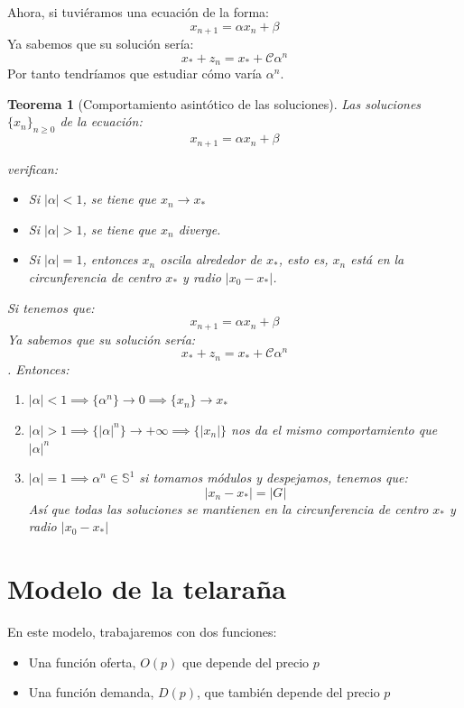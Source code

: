 \documentclass[11pt, a4paper, titlepage]{article}
\makeatletter
\renewenvironment{proof}[1][\proofname] {\vspace{-15pt}\par\pushQED{\qed}\normalfont\topsep6\p@\@plus6\p@\relax\trivlist\item[\hskip\labelsep\it#1\@addpunct{.}]\ignorespaces}{\popQED\endtrivlist\@endpefalse}
\theoremstyle{theorem-style}
\newtheorem*{nth}{Teorema}
\theoremstyle{definition-style}
\theoremstyle{remark-style}
\theoremstyle{example-style}
\newenvironment{nlist}
{\begin{enumerate}
\renewcommand\labelenumi{(\emph{\roman{enumi})}}}
{\end{enumerate}}
\makeatother
\begin{document}
Ahora, si tuviéramos una ecuación de la forma:
\[
x_{n+1}= \alpha x_n + \beta
\]
Ya sabemos que su solución sería:
\[
x_* +z_n = x_* + \mathcal{C}\alpha^n
\]
Por tanto tendríamos que estudiar cómo varía $\alpha^n$.


\begin{nth}[Comportamiento asintótico de las soluciones]
	Las soluciones $\{x_n\}_{n\geq0}$ de la ecuación:
\[
x_{n+1} = \alpha x_n + \beta
\]

verifican:

\begin{itemize}
\item Si $|\alpha| < 1$, se tiene que ${x_n} \to x_*$
\item Si $|\alpha| > 1$, se tiene que ${x_n}$ diverge.
\item Si $|\alpha| = 1$, entonces ${x_n}$ oscila alrededor de $x_*$, esto es, $x_n$ está en la circunferencia de centro $x_*$ y radio $|x_0 - x_*|$.
\end{itemize}\vspace{0.5cm}

	\begin{proof}
	Si tenemos que:
	\[
x_{n+1}= \alpha x_n + \beta
\]
Ya sabemos que su solución sería:
\[
x_* +z_n = x_* + \mathcal{C}\alpha^n
\]. Entonces:
\begin{nlist}
	\item $|\alpha|< 1 \implies \{\alpha^n\}\to 0 \implies \{x_n\} \to x_*$
	\item $|\alpha|> 1 \implies \{|\alpha|^n\}\to +\infty \implies \{|x_n|\}$ nos da el mismo comportamiento que $|\alpha|^n$
	\item $|\alpha| = 1 \implies \alpha^n \in \mathbb{S}^1$ si tomamos módulos y despejamos, tenemos que:
	\[
	|x_n -x_*| = |G|
	\]
	Así que todas las soluciones se mantienen en la circunferencia de centro $x_*$ y radio $|x_0-x_*|$
\end{nlist}
\end{proof}
\end{nth}

\section{Modelo de la telaraña}
En este modelo, trabajaremos con dos funciones: 
\begin{itemize}
	\item Una función oferta, $O(p)$ que depende del precio $p$
	\item Una función demanda, $D(p)$, que también depende del precio $p$
\end{itemize}
\end{document}
